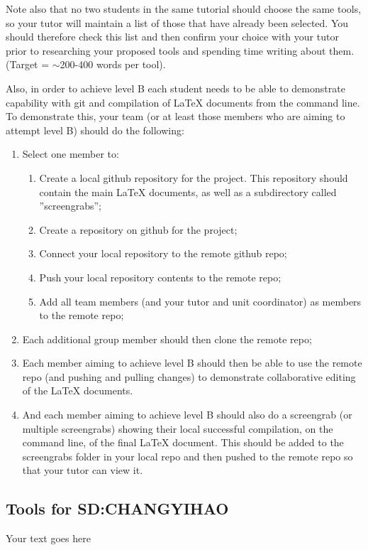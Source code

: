 \documentclass[a4paper, 11pt]{report}
\begin{document}
Note also that no two students in the same tutorial should choose the same tools, so your tutor will maintain a list of those that have already been selected. You should therefore check this list and then confirm your choice with your tutor prior to researching your proposed tools and spending time writing about them. (Target = $\sim$200-400 words per tool).
	
Also, in order to achieve level B each student needs to be able to demonstrate capability with git and compilation of LaTeX documents from the command line. To demonstrate this, your team (or at least those members who are aiming to attempt level B) should do the following:
\begin{enumerate}
	\item Select one member to:
	\begin{enumerate}
		\item Create a local github repository for the project. This repository should contain the main LaTeX documents, as well as a subdirectory called ''screengrabs'';
		\item Create a repository on github for the project;
		\item Connect your local repository to the remote github repo;
		\item Push your local repository contents to the remote repo;
		\item Add all team members (and your tutor and unit coordinator) as members to the remote repo;
	\end{enumerate}
		\item Each additional group member should then clone the remote repo;
		\item Each member aiming to achieve level B should then be able to use the remote repo (and pushing and pulling changes) to demonstrate collaborative editing of the LaTeX documents.
		\item And each member aiming to achieve level B should also do a screengrab (or multiple screengrabs) showing their local successful compilation, on the command line, of the final LaTeX document. This should be added to the screengrabs folder in your local repo and then pushed to the remote repo so that your tutor can view it.
\end{enumerate}
\subsection{Tools for SD:CHANGYIHAO}

Your text goes here
\end{document}
